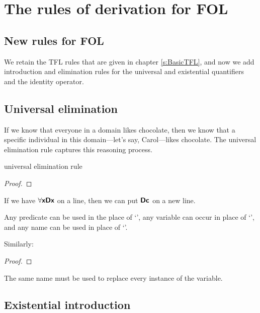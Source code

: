 \graphicspath{{figures--FOL/}}

\chapter{The rules of derivation for FOL}\label{FOL-rules}

\section{New rules for FOL}

We retain the TFL rules that are given in chapter \ref{s:BasicTFL}, and now we add introduction and elimination rules for the universal and existential quantifiers and the identity operator.

\section{Universal elimination}

If we know that everyone in a domain likes chocolate, then we know that a specific individual in this domain---let's say, Carol---likes chocolate. The universal elimination rule captures this reasoning process. 

\begin{factboxy}{universal elimination rule}
\begin{proof}
	 
\end{proof}

\small{If we have $\forall \bm{\mathsf{x Dx}}$ on a line, then we can put $\bm{\mathsf{Dc}}$ on a new line.
\smallskip

Any predicate can  be used in the place of `', any variable can occur in place of `', and any name can be used in place of `'.
\smallskip

Similarly:}

\begin{proof}
	 
\end{proof}

\small{The same name must be used to replace every instance of the variable.}

\end{factboxy}


\section{Existential introduction}

